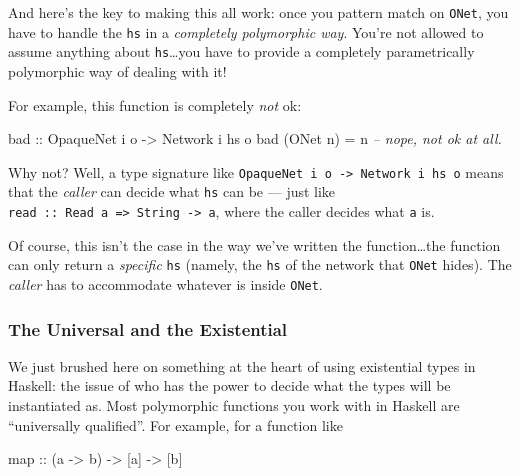 \documentclass[]{article}
\newenvironment{Shaded}{\begin{snugshade}}{\end{snugshade}}
\newcommand{\CommentTok}[1]{\textcolor[rgb]{0.56,0.35,0.01}{\textit{#1}}}
\newcommand{\DataTypeTok}[1]{\textcolor[rgb]{0.13,0.29,0.53}{#1}}
\newcommand{\FunctionTok}[1]{\textcolor[rgb]{0.00,0.00,0.00}{#1}}
\newcommand{\NormalTok}[1]{#1}
\newcommand{\OtherTok}[1]{\textcolor[rgb]{0.56,0.35,0.01}{#1}}
\begin{document}
And here's the key to making this all work: once you pattern match on
\texttt{ONet}, you have to handle the \texttt{hs} in a \emph{completely
polymorphic way}. You're not allowed to assume anything about
\texttt{hs}\ldots{}you have to provide a completely parametrically polymorphic
way of dealing with it!

For example, this function is completely \emph{not} ok:

\begin{Shaded}
\begin{Highlighting}[]
\OtherTok{bad ::} \DataTypeTok{OpaqueNet}\NormalTok{ i o }\OtherTok{->} \DataTypeTok{Network}\NormalTok{ i hs o}
\NormalTok{bad (}\DataTypeTok{ONet}\NormalTok{ n) }\FunctionTok{=}\NormalTok{ n            }\CommentTok{-- nope, not ok at all.}
\end{Highlighting}
\end{Shaded}

Why not? Well, a type signature like
\texttt{OpaqueNet\ i\ o\ -\textgreater{}\ Network\ i\ hs\ o} means that the
\emph{caller} can decide what \texttt{hs} can be --- just like
\texttt{read\ ::\ Read\ a\ =\textgreater{}\ String\ -\textgreater{}\ a}, where
the caller decides what \texttt{a} is.

Of course, this isn't the case in the way we've written the function\ldots{}the
function can only return a \emph{specific} \texttt{hs} (namely, the \texttt{hs}
of the network that \texttt{ONet} hides). The \emph{caller} has to accommodate
whatever is inside \texttt{ONet}.

\hypertarget{the-universal-and-the-existential}{%
\subsubsection{The Universal and the
Existential}\label{the-universal-and-the-existential}}

We just brushed here on something at the heart of using existential types in
Haskell: the issue of who has the power to decide what the types will be
instantiated as. Most polymorphic functions you work with in Haskell are
``universally qualified''. For example, for a function like

\begin{Shaded}
\begin{Highlighting}[]
\NormalTok{map}\OtherTok{ ::}\NormalTok{ (a }\OtherTok{->}\NormalTok{ b) }\OtherTok{->}\NormalTok{ [a] }\OtherTok{->}\NormalTok{ [b]}
\end{Highlighting}
\end{Shaded}
\end{document}
